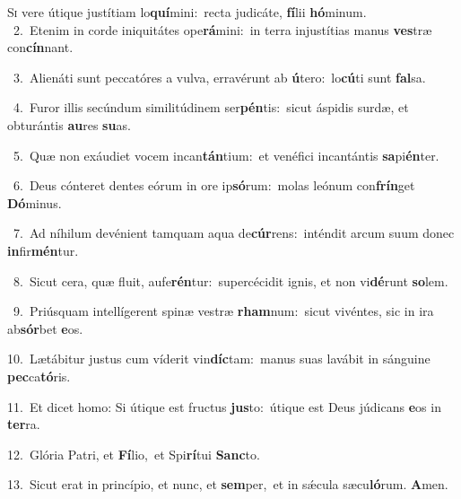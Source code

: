 \lettrine{\initial\textcolor{\initialcolor}{S}}{i} vere útique justítiam lo\-\textbf{quí}\-mini:~\star recta judicáte, \textbf{fí}\-lii \textbf{hó}\-minum.\\
{\numbfont\textcolor{\numbcolor}{~2.}}~Etenim in corde iniquitátes ope\-\textbf{rá}\-mini:~\star in terra injustítias manus \textbf{ves}\-træ con\-\textbf{cín}\-nant.\par
{\numbfont\textcolor{\numbcolor}{~3.}}~Alienáti sunt peccatóres a vulva, erravérunt ab \textbf{ú}\-tero:~\star lo\-\textbf{cú}\-ti sunt \textbf{fal}\-sa.\par
{\numbfont\textcolor{\numbcolor}{~4.}}~Furor illis secúndum similitúdinem ser\-\textbf{pén}\-tis:~\star sicut áspidis surdæ, et obturántis \textbf{au}\-res \textbf{su}\-as.\par
{\numbfont\textcolor{\numbcolor}{~5.}}~Quæ non exáudiet vocem incan\-\textbf{tán}\-tium:~\star et venéfici incantántis \textbf{sa}\-pi\-\textbf{én}\-ter.\par
{\numbfont\textcolor{\numbcolor}{~6.}}~Deus cónteret dentes eórum in ore ip\-\textbf{só}\-rum:~\star molas leónum con\-\textbf{frín}\-get \textbf{Dó}\-minus.\par
{\numbfont\textcolor{\numbcolor}{~7.}}~Ad níhilum devénient tamquam aqua de\-\textbf{cúr}\-rens:~\star inténdit arcum suum donec \textbf{in}\-fir\-\textbf{mén}\-tur.\par
{\numbfont\textcolor{\numbcolor}{~8.}}~Sicut cera, quæ fluit, aufe\-\textbf{rén}\-tur:~\star supercécidit ignis, et non vi\-\textbf{dé}\-runt \textbf{so}\-lem.\par
{\numbfont\textcolor{\numbcolor}{~9.}}~Priúsquam intellígerent spinæ vestræ \textbf{rham}\-num:~\star sicut vivéntes, sic in ira ab\-\textbf{sór}\-bet \textbf{e}\-os.\par
{\numbfont\textcolor{\numbcolor}{10.}}~Lætábitur justus cum víderit vin\-\textbf{díc}\-tam:~\star manus suas lavábit in sánguine \textbf{pec}\-ca\-\textbf{tó}\-ris.\par
{\numbfont\textcolor{\numbcolor}{11.}}~Et dicet homo: Si útique est fructus \textbf{jus}\-to:~\star útique est Deus júdicans \textbf{e}\-os in \textbf{ter}\-ra.\par
{\numbfont\textcolor{\numbcolor}{12.}}~Glória Patri, et \textbf{Fí}\-lio,~\star et Spi\-\textbf{rí}\-tui \textbf{Sanc}\-to.\par
{\numbfont\textcolor{\numbcolor}{13.}}~Sicut erat in princípio, et nunc, et \textbf{sem}\-per,~\star et in sǽcula sæcu\-\textbf{ló}\-rum. \textbf{A}\-men.\par

